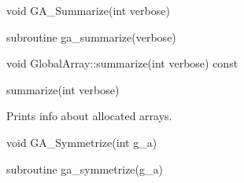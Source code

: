 \documentclass[12pt]{article}
\begin{document}

\begin{capi}
\begin{ccode}
void GA_Summarize(int verbose)
\end{ccode}
\begin{funcargs}
\end{funcargs}
\end{capi}

\begin{fapi}
\begin{fcode}
subroutine ga_summarize(verbose)
\end{fcode}
\begin{funcargs}
\end{funcargs}
\end{fapi}

\begin{cxxapi}
\begin{cxxcode}
void GlobalArray::summarize(int verbose) const
\end{cxxcode}
\begin{funcargs}
\end{funcargs}
\end{cxxapi}

\begin{pyapi}
\begin{pycode}
summarize(int verbose)
\end{pycode}
\end{pyapi}
\local
\begin{desc}

Prints info about allocated arrays.
\end{desc}


\begin{capi}
\begin{ccode}
void GA_Symmetrize(int g_a)
\end{ccode}
\begin{funcargs}
\end{funcargs}
\end{capi}

\begin{fapi}
\begin{fcode}
subroutine ga_symmetrize(g_a)
\end{fcode}
\begin{funcargs}
\end{funcargs}
\end{fapi}
\end{document}
